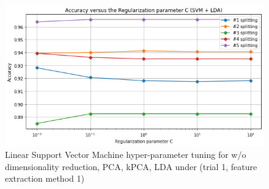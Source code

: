 \documentclass{article}
\begin{document}
\begin{figure}[!htb]
  \includegraphics[width=\linewidth]{figure/svm_lda.png}
\endminipage
\caption{Linear Support Vector Machine hyper-parameter tuning for w/o dimensionality reduction, PCA, kPCA, LDA under (trial 1, feature extraction method 1)}
\label{lsvm_hyper}
\end{figure}
\end{document}
